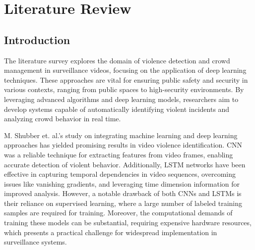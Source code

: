 \chapter{Literature Review}


\setcounter{equation}{0}
\setlength{\parskip}{3ex}

\section{Introduction}

\vspace{-5mm}

\noindent The literature survey explores the domain of violence detection and crowd management in surveillance videos, focusing on the application of deep learning techniques. These approaches are vital for ensuring public safety and security in various contexts, ranging from public spaces to high-security environments. By leveraging advanced algorithms and deep learning models, researchers aim to develop systems capable of automatically identifying violent incidents and analyzing crowd behavior in real time.

\noindent M. Shubber et. al.'s study on integrating machine learning and deep learning approaches \cite{violence_review} has yielded promising results in video violence identification. CNN was a reliable technique for extracting features from video frames, enabling accurate detection of violent behavior. Additionally, LSTM networks have been effective in capturing temporal dependencies in video sequences, overcoming issues like vanishing gradients, and leveraging time dimension information for improved analysis. However, a notable drawback of both CNNs and LSTMs is their reliance on supervised learning, where a large number of labeled training samples are required for training. Moreover, the computational demands of training these models can be substantial, requiring expensive hardware resources, which presents a practical challenge for widespread implementation in surveillance systems.


